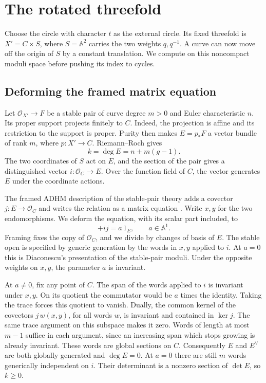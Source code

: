 \section{The rotated threefold}\label{sec:rotated}

Choose the circle with character \(t\) as the external circle. Its fixed
threefold is \(X'=C\times S\), where \(S=\mathbb A^2\) carries the two
weights \(q,q^{-1}\). A curve can now move off the origin of \(S\) by a
constant translation. We compute on this noncompact moduli space before
pushing its index to cycles.

\subsection{Deforming the framed matrix equation}

Let \(\mathcal O_{X'}\to F\) be a stable pair of curve degree \(m>0\) and
Euler characteristic \(n\). Its proper support projects finitely to \(C\).
Indeed, the projection is affine and its restriction to the support is
proper. Purity then makes \(E=p_*F\) a vector bundle of rank \(m\),
where \(p:X'\to C\). Riemann--Roch gives
\begin{equation}
 k=\deg E=n+m(g-1).
 \label{eq:rotated-excess}
\end{equation}
The two coordinates of \(S\) act on \(E\), and the section of the pair
gives a distinguished vector \(i:\mathcal O_C\to E\). Over the function
field of \(C\), the vector generates \(E\) under the coordinate actions.

The framed ADHM description of the stable-pair theory adds a covector
\(j:E\to\mathcal O_C\) and writes the relation as a matrix equation
\cite[Theorem~1.9 and \S7]{diaconescu}. Write \(x,y\) for the two
endomorphisms. We deform the equation, with its scalar part included, to
\begin{equation}
 [x,y]+ij=a\,1_E,\qquad a\in\mathbb A^1 .
 \label{eq:rotated-adhm}
\end{equation}
Framing fixes the copy of \(\mathcal O_C\), and we divide by changes of
basis of \(E\). The stable open is specified by generic generation by
the words in \(x,y\) applied to \(i\). At \(a=0\) this is
Diaconescu's presentation of the stable-pair moduli. Under the opposite
weights on \(x,y\), the parameter \(a\) is invariant.

At \(a\ne0\), fix any point of \(C\). The span of the words applied to
\(i\) is invariant under \(x,y\). On its quotient the commutator would be
\(a\) times the identity. Taking the trace forces this quotient to vanish.
Dually, the common kernel of the covectors \(j\,w(x,y)\), for all words
\(w\), is invariant and contained in \(\ker j\). The same trace argument
on this subspace makes it zero. Words of length at most \(m-1\) suffice
in each argument, since an increasing span which stops growing is already
invariant. These words are global sections on \(C\). Consequently \(E\)
and \(E^\vee\) are both globally generated and \(\deg E=0\). At \(a=0\)
there are still \(m\) words generically independent on \(i\). Their
determinant is a nonzero section of \(\det E\), so \(k\ge0\).

